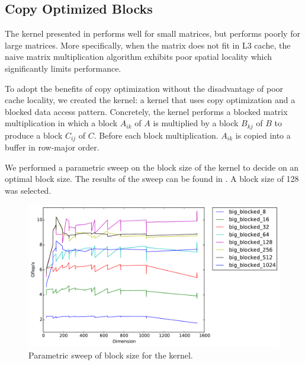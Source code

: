 \subsection{Copy Optimized Blocks}
The  kernel presented in  performs well for small
matrices, but performs poorly for large matrices. More specifically, when the
matrix does not fit in L3 cache, the naive matrix multiplication algorithm
exhibits poor spatial locality which significantly limits performance.

To adopt the benefits of copy optimization without the disadvantage of poor
cache locality, we created the  kernel: a kernel that uses
copy optimization and a blocked data access pattern. Concretely, the
 kernel performs a blocked matrix multiplication in which a
block $A_{ik}$ of $A$ is multiplied by a block $B_{kj}$ of $B$ to produce a
block $C_{ij}$ of $C$. Before each block multiplication. $A_{ik}$ is copied
into a buffer in row-major order.

We performed a parametric sweep on the block size of the 
kernel to decide on an optimal block size. The results of the sweep can be
found in . A block size of 128 was selected.

\begin{figure}[h]
  \centering
  \includegraphics[width=\textwidth]{img/timing_big_block_sweep.pdf}
  \caption{Parametric sweep of block size for the  kernel.}
  \label{fig:block-sweep}
\end{figure}

